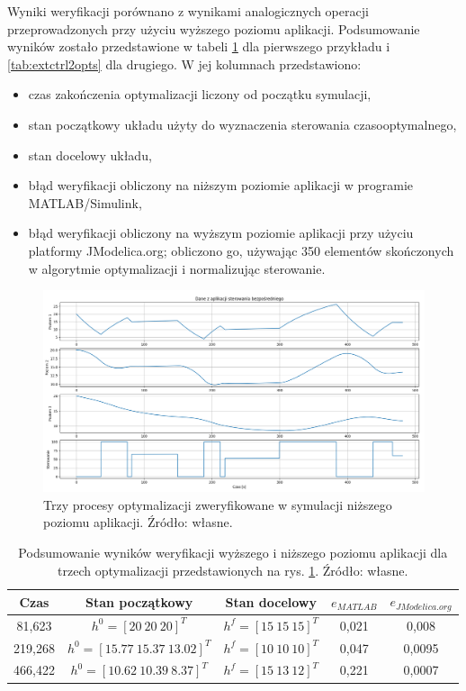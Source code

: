 Wyniki weryfikacji porównano z wynikami analogicznych operacji przeprowadzonych przy użyciu wyższego poziomu aplikacji. Podsumowanie wyników zostało przedstawione w tabeli \ref{tab:extctrl3opts} dla pierwszego przykładu i \ref{tab:extctrl2opts} dla drugiego. W jej kolumnach przedstawiono:
\begin{itemize}
    \item czas zakończenia optymalizacji liczony od początku symulacji,
    \item stan początkowy układu użyty do wyznaczenia sterowania czasooptymalnego,
    \item stan docelowy układu,
    \item błąd weryfikacji obliczony na niższym poziomie aplikacji w programie MATLAB/Simulink,
    \item błąd weryfikacji obliczony na wyższym poziomie aplikacji przy użyciu platformy JModelica.org; obliczono go, używając 350 elementów skończonych w algorytmie optymalizacji i normalizując sterowanie.
\end{itemize}

\begin{figure}
    \centering
    \includegraphics[scale=0.5,angle=90]{Grafika/ext_ctrl_3_opts}
    \caption{Trzy procesy optymalizacji zweryfikowane w symulacji niższego poziomu aplikacji. Źródło: własne.}
    \label{fig:extctrl3opts}
\end{figure}


\begin{table}[htp]
    \centering
    \begin{tabular}{|c|c|c|c|c|}
        \hline 
        \textbf{Czas} & \textbf{Stan początkowy} & \textbf{Stan docelowy} & \textbf{$e_{MATLAB}$} & \textbf{$e_{JModelica.org}$} \\ 
        \hline 
        81,623 & $h^{0} = [20 ~20~ 20]^{T}$ & $h^{f} = [15 ~15~ 15]^{T}$ & 0,021 & 0,008 \\ 
        \hline 
        219,268 & $h^{0} = [15.77~ 15.37~ 13.02]^{T}$ & $h^{f} = [10 ~10~ 10]^{T}$ & 0,047 & 0,0095 \\ 
        \hline 
        466,422 & $h^{0} = [10.62~ 10.39~ 8.37]^{T}$ & $h^{f} = [15 ~13~ 12]^{T}$ & 0,221 & 0,0007 \\ 
        \hline 
    \end{tabular}
\caption{Podsumowanie wyników weryfikacji wyższego i niższego poziomu aplikacji dla trzech optymalizacji przedstawionych na rys. \ref{fig:extctrl3opts}. Źródło: własne.}
\label{tab:extctrl3opts}
\end{table}

